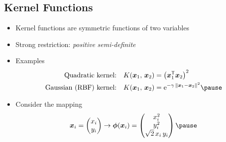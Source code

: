 \begin{slide}
\section[-2]{Kernel Functions}

\begin{PauseHighLight}
  \begin{itemize}
  \item Kernel functions are symmetric functions of two variables\pause
  \item Strong restriction: \textit{positive semi-definite}\pause
  \item Examples
    \begin{align*}
      \mbox{Quadratic kernel:}&& K(\bm{x}_1,\,\bm{x}_2)&=
      \left(\bm{x}_1^\tr\bm{x}_2\right)^2 \\
      \mbox{Gaussian (RBF) kernel:}&& K(\bm{x}_1,\,\bm{x}_2)&=
      \mathrm{e}^{-\gamma\,\|\bm{x}_1-\bm{x}_2\|^2}\pause
    \end{align*}
  \item Consider the mapping
    \begin{align*}
      \bm{x}_i =
      \begin{pmatrix}
        x_i \\ y_i
      \end{pmatrix}
      \rightarrow
      \bm{\phi}(\bm{x}_i) =
      \begin{pmatrix}
        x_i^2 \\ y_i^2 \\ \sqrt{2}\,x_i\,y_i 
      \end{pmatrix}\pause
    \end{align*}
  \end{itemize}
\end{PauseHighLight}

\end{slide}



